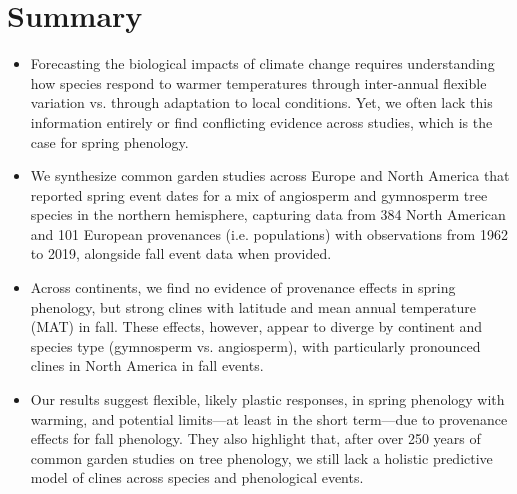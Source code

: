 \documentclass[12pt]{article}
\begin{document}
\newpage
\linenumbers

\section*{Summary}


\begin{itemize} %
  \item Forecasting the biological impacts of climate change requires understanding how species respond to warmer temperatures through inter-annual flexible variation vs. through adaptation to local conditions. Yet, we often lack this information entirely or find conflicting evidence across studies, which is the case for spring phenology.
  \item We synthesize common garden studies across Europe and North America that reported spring event dates for a mix of angiosperm and gymnosperm tree species in the northern hemisphere, capturing data from 384 North American and 101 European provenances (i.e. populations) with observations from 1962 to 2019, alongside fall event data when provided.
  \item Across continents, we find no evidence of provenance effects in spring phenology, but strong clines with latitude and mean annual temperature (MAT) in fall. These effects, however, appear to diverge by continent and species type (gymnosperm vs. angiosperm), with particularly pronounced clines in North America in fall events.
  \item Our results suggest flexible, likely plastic responses, in spring phenology with warming, and potential limits---at least in the short term---due to provenance effects for fall phenology. They also highlight that, after over 250 years of common garden studies on tree phenology, we still lack a holistic predictive model of clines across species and phenological events.
\end{itemize}
\end{document}
